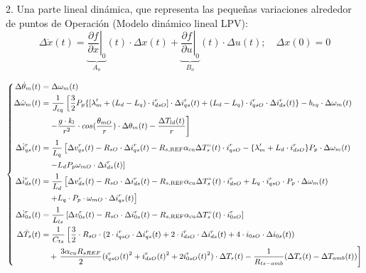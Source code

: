 \documentclass{article}
\begin{document}
2. Una parte lineal dinámica, que representa las pequeñas variaciones alrededor de puntos de Operación (Modelo dinámico lineal LPV):
\begin{equation}
\Delta\dot{x}(t) = \underbrace{\left.\frac{\partial f}{\partial x}\right|_0}_{A_o}(t)\cdot\Delta x(t) + \underbrace{\left.\frac{\partial f}{\partial u}\right|_0}_{B_o}(t)\cdot\Delta u(t); \quad \Delta x(0) = 0
\label{Ec.30}
\end{equation}

\begin{equation}
\small
\left\{
\begin{aligned}
\Delta\dot{\theta}_m(t) &= \Delta\omega_m(t) \\
\Delta\dot{\omega}_m(t) &= \frac{1}{J_{eq}}\left[\frac{3}{2} P_p\{[\lambda_m' + (L_d - L_q)\cdot i^r_{dsO}]\cdot\Delta i^r_{qs}(t) + (L_d - L_q)\cdot i^r_{qsO}\cdot\Delta i^r_{ds}(t)\} - b_{eq}\cdot\Delta\omega_m(t)\right. \\
&\quad \left. -\frac{g\cdot k_l}{r^2} \cdot cos(\frac{\theta_{mO}}{r})\cdot\Delta\theta_m(t) - \frac{\Delta T_{ld}(t)}{r}\right] \\
\Delta\dot{i}^r_{qs}(t) &= \frac{1}{L_q}\left[\Delta v^r_{qs}(t) - R_{sO}\cdot\Delta i^r_{qs}(t) - R_{s, \text{REF}}\alpha_\text{cu}\Delta T^\circ_s(t)\cdot i^r_{qsO} - \{\lambda_m' + L_d\cdot i^r_{dsO}\} P_p\cdot\Delta\omega_m(t)\right. \\
&\quad \left. - L_d P_p\omega_{mO}\cdot\Delta i^r_{ds}(t)\right] \\
\Delta\dot{i}^r_{ds}(t) &= \frac{1}{L_d}\left[\Delta v^r_{ds}(t) - R_{sO}\cdot\Delta i^r_{ds}(t) - R_{s, \text{REF}}\alpha_\text{cu}\Delta T^\circ_s(t)\cdot i^r_{dsO} + L_q\cdot i^r_{qsO}\cdot P_p\cdot\Delta\omega_m(t)\right. \\
&\quad \left. + L_q\cdot P_p\cdot\omega_{mO}\cdot\Delta i^r_{qs}(t)\right] \\
\Delta\dot{i}^r_{0s}(t) &= \frac{1}{L_{ls}}\left[\Delta v^r_{0s}(t) - R_{sO}\cdot\Delta i^r_{0s}(t) - R_{s, \text{REF}}\alpha_\text{cu}\Delta T^\circ_s(t)\cdot i^r_{0sO}\right] \\
\Delta\dot{T}_s(t) &= \frac{1}{C_{ts}}\left[\frac{3}{2}\cdot R_{sO}\cdot(2\cdot i^r_{qsO}\cdot\Delta i^r_{qs}(t) + 2\cdot i^r_{dsO}\cdot\Delta i^r_{ds}(t) + 4\cdot i_{0sO}\cdot\Delta i_{0s}(t))\right. \\
&\quad + \left. \frac{3\alpha_{cu}R_{sREF}}{2}(i^r_{qsO}(t)^2 + i^r_{dsO}(t)^2 + 2i^r_{0sO}(t)^2)\cdot\Delta T_s(t) - \frac{1}{R_{ts-amb}}(\Delta T_s(t) - \Delta T_{amb}(t))\right]
\end{aligned}
\right.
\label{eq:SistemaGlobalLPV}
\end{equation}
\end{document}
